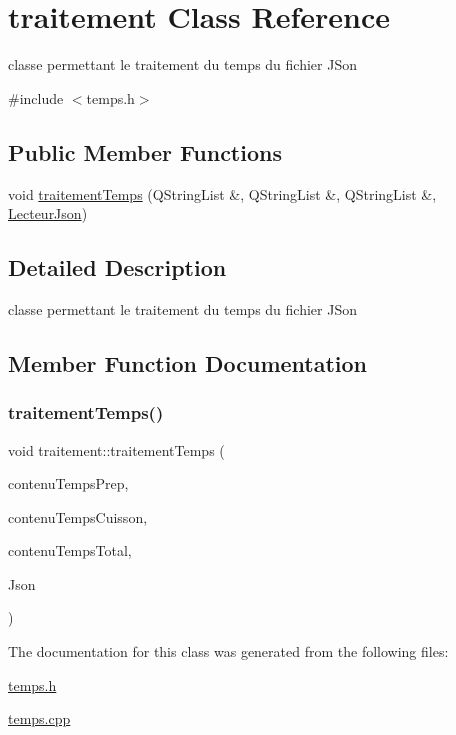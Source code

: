 \hypertarget{classtraitement}{}\section{traitement Class Reference}
\label{classtraitement}


classe permettant le traitement du temps du fichier J\+Son  




{\ttfamily \#include $<$temps.\+h$>$}

\subsection*{Public Member Functions}
\begin{DoxyCompactItemize}
\item 
void \hyperlink{classtraitement_a2bc46fa58a25e3f3bf87dfc4fd08ebf8}{traitement\+Temps} (Q\+String\+List \&, Q\+String\+List \&, Q\+String\+List \&, \hyperlink{class_lecteur_json}{Lecteur\+Json})
\end{DoxyCompactItemize}


\subsection{Detailed Description}
classe permettant le traitement du temps du fichier J\+Son 

\subsection{Member Function Documentation}
\mbox{\label{classtraitement_a2bc46fa58a25e3f3bf87dfc4fd08ebf8}} 
\subsubsection{\texorpdfstring{traitement\+Temps()}{traitementTemps()}}
{\footnotesize\ttfamily void traitement\+::traitement\+Temps (\begin{DoxyParamCaption}\item[{Q\+String\+List \&}]{contenu\+Temps\+Prep,  }\item[{Q\+String\+List \&}]{contenu\+Temps\+Cuisson,  }\item[{Q\+String\+List \&}]{contenu\+Temps\+Total,  }\item[{\hyperlink{class_lecteur_json}{Lecteur\+Json}}]{Json }\end{DoxyParamCaption})}



The documentation for this class was generated from the following files\+:\begin{DoxyCompactItemize}
\item 
\hyperlink{temps_8h}{temps.\+h}\item 
\hyperlink{temps_8cpp}{temps.\+cpp}\end{DoxyCompactItemize}
